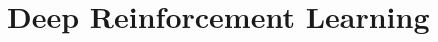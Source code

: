 \begin{lstlisting}[language=C++]
\end{lstlisting}
 
\begin{lstlisting}[language=C++]
\end{lstlisting}
 
\section{Deep Reinforcement Learning}

